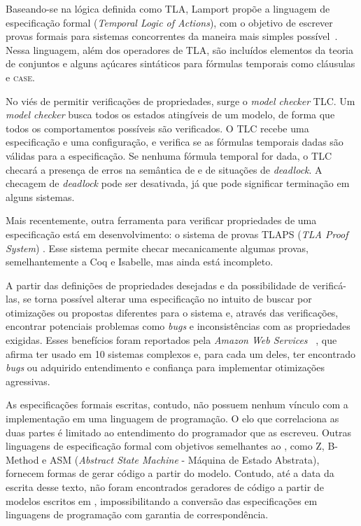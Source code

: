 Baseando-se na lógica definida como TLA, Lamport propõe a linguagem de especificação formal \TLA (\textit{Temporal Logic of Actions}), com o objetivo de escrever provas formais para sistemas concorrentes da maneira mais simples possível~\cite{tlahistory}. Nessa linguagem, além dos operadores de TLA, são incluídos elementos da teoria de conjuntos e alguns açúcares sintáticos para fórmulas temporais como cláusulas \IF e \textsc{case}.

No viés de permitir verificações de propriedades, surge o \textit{model checker} TLC. Um \textit{model checker} busca todos os estados atingíveis de um modelo, de forma que todos os comportamentos possíveis são verificados. O TLC recebe uma especificação e uma configuração, e verifica se as fórmulas temporais dadas são válidas para a especificação. Se nenhuma fórmula temporal for dada, o TLC checará a presença de erros na semântica de \TLA e de situações de \textit{deadlock}. A checagem de \textit{deadlock} pode ser desativada, já que pode significar terminação em alguns sistemas.

Mais recentemente, outra ferramenta para verificar propriedades de uma especificação está em desenvolvimento: o sistema de provas TLAPS (\textit{TLA Proof System}) \cite{tlaps2010}. Esse sistema permite checar mecanicamente algumas provas, semelhantemente a Coq e Isabelle, mas ainda está incompleto.

A partir das definições de propriedades desejadas e da possibilidade de verificá-las, se torna possível alterar uma especificação no intuito de buscar por otimizações ou propostas diferentes para o sistema e, através das verificações, encontrar potenciais problemas como \textit{bugs} e inconsistências com as propriedades exigidas. Esses benefícios foram reportados pela \textit{Amazon Web Services} ~\cite{amazon}, que afirma ter usado \TLA em 10 sistemas complexos e, para cada um deles, ter encontrado \textit{bugs} ou adquirido entendimento e confiança para implementar otimizações agressivas.

As especificações formais escritas, contudo, não possuem nenhum vínculo com a implementação em uma linguagem de programação. O elo que correlaciona as duas partes é limitado ao entendimento do programador que as escreveu. Outras linguagens de especificação formal com objetivos semelhantes ao \TLA, como Z, B-Method e ASM (\textit{Abstract State Machine} - Máquina de Estado Abstrata), fornecem formas de gerar código a partir do modelo. Contudo, até a data da escrita desse texto, não foram encontrados geradores de código a partir de modelos escritos em \TLA, impossibilitando a conversão das especificações em linguagens de programação com garantia de correspondência.

